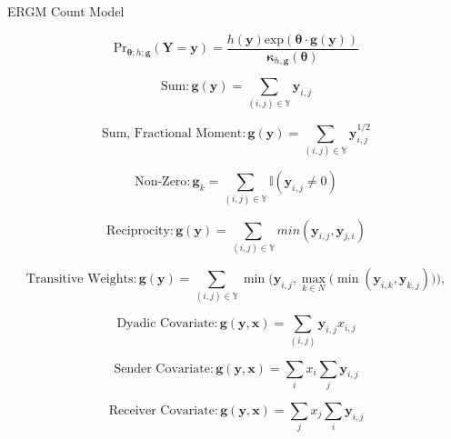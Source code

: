 \documentclass{beamer}
\begin{document}
\begin{frame}{ERGM Count Model}

\small{

$$ \text{Pr}_{\bm{\theta};h;\bm{g}}( \bm{Y}=\bm{y} )=\frac{ h(\bm{y})\text{exp}( \bm{\theta} \cdot \bm{g} (\bm{y}) )}{\bm{\kappa}_{h,\bm{g}}(\bm{\theta})} $$

$$\text{Sum}:\bm{g(y)} = \sum_{(i,j) {\in} \mathbb{Y}}\bm{y}_{i,j}$$

$$\text{Sum, Fractional Moment}:\bm{g(y)} = \sum_{(i,j) {\in} \mathbb{Y}}\bm{y}_{i,j}^{1/2}$$

$$\text{Non-Zero}: \bm{g}_k = \sum_{(i,j) {\in} \mathbb{Y}} \mathbb{I}(\bm{y}_{i,j} \neq 0)$$

$$ \text{Reciprocity}: \bm{g(y)} = \sum_{(i,j) {\in} \mathbb{Y}}min(\bm{y}_{i,j},\bm{y}_{j,i})$$

$$\text{Transitive Weights}: \bm{g(y)} =  \sum_{(i,j) {\in} \mathbb{Y}}\min\bigg( \bm{y}_{i,j}, \max\limits_{k{\in}N}\Big(\min(\bm{y}_{i,k},\bm{y}_{k,j})\Big) \bigg),$$ 

$$ \text{Dyadic Covariate}: \bm{g(y,x)} = \sum_{(i,j)} \bm{y}_{i,j}x_{i,j}$$ 

$$ \text{Sender Covariate}: \bm{g(y,x)} = \sum_{i}x_i \sum_{j} \bm{y}_{i,j}$$

$$ \text{Receiver Covariate}: \bm{g(y,x)} = \sum_{j}x_j \sum_{i} \bm{y}_{i,j}$$

}








\end{frame}
\end{document}
